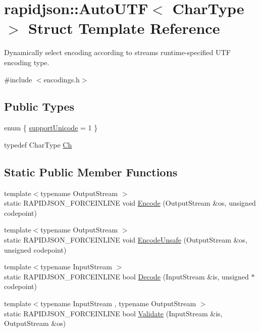 \hypertarget{structrapidjson_1_1_auto_u_t_f}{}\section{rapidjson\+::Auto\+U\+TF$<$ Char\+Type $>$ Struct Template Reference}
\label{structrapidjson_1_1_auto_u_t_f}


Dynamically select encoding according to stream\textquotesingle{}s runtime-\/specified U\+TF encoding type.  




{\ttfamily \#include $<$encodings.\+h$>$}

\subsection*{Public Types}
\begin{DoxyCompactItemize}
\item 
enum \{ \mbox{\hyperlink{structrapidjson_1_1_auto_u_t_f_aa9095b9e85767361f9a0ae5527dba101a15b55b712f9e34d146fb236e5a89e06e}{support\+Unicode}} = 1
 \}
\item 
typedef Char\+Type \mbox{\hyperlink{structrapidjson_1_1_auto_u_t_f_a8ba58f529fad9b33dc419b12ee13844d}{Ch}}
\end{DoxyCompactItemize}
\subsection*{Static Public Member Functions}
\begin{DoxyCompactItemize}
\item 
{\footnotesize template$<$typename Output\+Stream $>$ }\\static R\+A\+P\+I\+D\+J\+S\+O\+N\+\_\+\+F\+O\+R\+C\+E\+I\+N\+L\+I\+NE void \mbox{\hyperlink{structrapidjson_1_1_auto_u_t_f_a4c9a9fd8666f1269997e40b587175c26}{Encode}} (Output\+Stream \&os, unsigned codepoint)
\item 
{\footnotesize template$<$typename Output\+Stream $>$ }\\static R\+A\+P\+I\+D\+J\+S\+O\+N\+\_\+\+F\+O\+R\+C\+E\+I\+N\+L\+I\+NE void \mbox{\hyperlink{structrapidjson_1_1_auto_u_t_f_ac55057f44fd139ccf5044b7503c441c3}{Encode\+Unsafe}} (Output\+Stream \&os, unsigned codepoint)
\item 
{\footnotesize template$<$typename Input\+Stream $>$ }\\static R\+A\+P\+I\+D\+J\+S\+O\+N\+\_\+\+F\+O\+R\+C\+E\+I\+N\+L\+I\+NE bool \mbox{\hyperlink{structrapidjson_1_1_auto_u_t_f_ad722cc64bca2bacddd1029d8980c4ac2}{Decode}} (Input\+Stream \&is, unsigned $\ast$codepoint)
\item 
{\footnotesize template$<$typename Input\+Stream , typename Output\+Stream $>$ }\\static R\+A\+P\+I\+D\+J\+S\+O\+N\+\_\+\+F\+O\+R\+C\+E\+I\+N\+L\+I\+NE bool \mbox{\hyperlink{structrapidjson_1_1_auto_u_t_f_a5454260f314ab07a9f747d268a79e70a}{Validate}} (Input\+Stream \&is, Output\+Stream \&os)
\end{DoxyCompactItemize}


